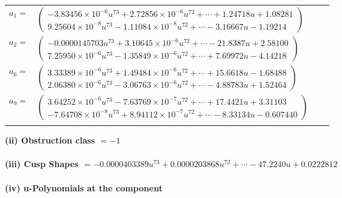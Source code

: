 \documentclass[1p]{elsarticle_modified}
\theoremstyle{definition}
\begin{document}
\begin{tabular}{m{7pt} m{180pt} m{7pt} m{180pt} }
\flushright $a_{1}=$&$\begin{pmatrix}-3.83456\times10^{-6} u^{73}+2.72856\times10^{-6} u^{72}+\cdots+1.24718 u+1.08281\\9.25604\times10^{-8} u^{73}-1.11084\times10^{-8} u^{72}+\cdots-3.16667 u-1.19214\end{pmatrix}$ \\
\flushright $a_{2}=$&$\begin{pmatrix}-0.0000145703 u^{73}+3.10645\times10^{-6} u^{72}+\cdots-21.8387 u+2.58100\\7.25950\times10^{-6} u^{73}-1.35849\times10^{-6} u^{72}+\cdots+7.69972 u-4.14218\end{pmatrix}$ \\
\flushright $a_{6}=$&$\begin{pmatrix}3.33389\times10^{-6} u^{73}+1.49484\times10^{-6} u^{72}+\cdots+15.6618 u-1.68488\\2.06380\times10^{-6} u^{73}-3.06763\times10^{-6} u^{72}+\cdots-4.88783 u+1.52464\end{pmatrix}$ \\
\flushright $a_{9}=$&$\begin{pmatrix}3.64252\times10^{-6} u^{73}-7.63769\times10^{-7} u^{72}+\cdots+17.4421 u+3.31103\\-7.64708\times10^{-8} u^{73}+8.94112\times10^{-7} u^{72}+\cdots-8.33134 u-0.607440\end{pmatrix}$\\&\end{tabular}
\flushleft \textbf{(ii) Obstruction class $= -1$}\\~\\
\flushleft \textbf{(iii) Cusp Shapes $= -0.0000403389 u^{73}+0.0000203868 u^{72}+\cdots-47.2240 u+0.0222812$}\\~\\
\newpage\renewcommand{\arraystretch}{1}
\flushleft \textbf{(iv) u-Polynomials at the component}\newline \\
\end{document}

